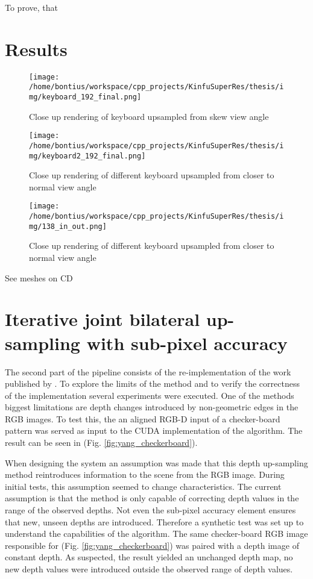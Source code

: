 \documentclass{ucl_thesis}
\newcommand{\figref}[1]{(Fig. \ref{#1})}
\begin{document}
To prove, that %

\section{Results}
\label{sec:results}

\begin{figure}[h!]\centering
    \texttt{[image: /home/bontius/workspace/cpp\_projects/KinfuSuperRes/thesis/img/keyboard\_192\_final.png]}
    \caption{Close up rendering of keyboard upsampled from skew view angle}
    \label{fig:keyboard_192}
\end{figure}

\begin{figure}[h!]\centering
    \texttt{[image: /home/bontius/workspace/cpp\_projects/KinfuSuperRes/thesis/img/keyboard2\_192\_final.png]}
    \caption{Close up rendering of different keyboard upsampled from closer to normal view angle}
    \label{fig:keyboard2_192}
\end{figure}

\begin{figure}[h!]\centering
    \texttt{[image: /home/bontius/workspace/cpp\_projects/KinfuSuperRes/thesis/img/138\_in\_out.png]}
    \caption{Close up rendering of different keyboard upsampled from closer to normal view angle}
    \label{fig:keyboard2_192}
\end{figure}

See meshes on CD

\section{Iterative joint bilateral up-sampling with sub-pixel accuracy}
\label{sec:yang}

\par The second part of the pipeline consists of the re-implementation of the work published by \citep{cvpr-07-qingxiong-yang}. To explore the limits of the method and to verify the correctness of the implementation several experiments were executed. One of the methods biggest limitations are depth changes introduced by non-geometric edges in the RGB images. To test this, the an aligned RGB-D input of a checker-board pattern was served as input to the CUDA implementation of the algorithm. The result can be seen in \figref{fig:yang_checkerboard}. 
\par When designing the system an assumption was made that this depth up-sampling method reintroduces information to the scene from the RGB image. During initial tests, this assumption seemed to change characteristics. The current assumption is that the method is only capable of correcting depth values in the range of the observed depths. Not even the sub-pixel accuracy element ensures that new, unseen depths are introduced. Therefore a synthetic test was set up to understand the capabilities of the algorithm. The same checker-board RGB image responsible for \figref{fig:yang_checkerboard} was paired with a depth image of constant depth. As suspected, the result yielded an unchanged depth map, no new depth values were introduced outside the observed range of depth values.
\end{document}
